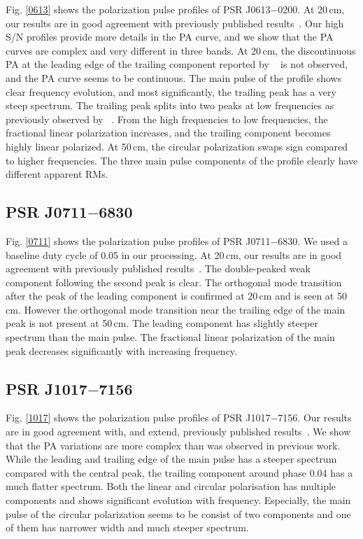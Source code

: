 \documentclass[useAMS,usenatbib]{mn2e}
\begin{document}
\begin{appendix}
Fig. \ref{0613} shows the polarization pulse profiles of 
PSR J0613$-$0200.
%
At 20\,cm, our results are in good agreement with previously published
results~\citep{Ord04,Yan11}. 
%
Our high S/N profiles provide more details in the PA curve, and we show that 
the PA curves are complex and very different in three bands. 
%
At 20\,cm, the discontinuous PA at the leading edge of the trailing 
component reported by ~\citet{Yan11} is not observed, and the PA curve seems 
to be continuous.
%
The main pulse of the profile shows clear frequency evolution, and most 
significantly, the trailing peak has a very steep spectrum. The 
trailing peak splits into two peaks at low frequencies as previously 
observed by ~\citet{Stairs99}.
%
From the high frequencies to low frequencies, the fractional linear 
polarization increases, and the trailing component becomes highly linear 
polarized. 
%
At 50\,cm, the circular polarization swaps sign compared to higher 
frequencies.
%
The three main pulse components of the profile clearly have different 
apparent RMs. 

\subsection{PSR J0711$-$6830}

Fig. \ref{0711} shows the polarization pulse profiles 
of PSR J0711$-$6830.
%
We used a baseline duty cycle of 0.05 in our processing.
%
At 20\,cm, our results are in good agreement with previously published
results~\citep{Ord04,Yan11}. 
%
The double-peaked weak component following the second peak is clear.
%
The orthogonal mode transition after the peak of the leading component 
is confirmed at 20\,cm and is seen at 50\,cm.
However the orthogonal mode transition near the trailing edge 
of the main peak is not present at 50\,cm.
%
The leading component has slightly steeper spectrum than the main pulse. 
The fractional linear polarization of the main peak decreases significantly 
with increasing frequency. 


\subsection{PSR J1017$-$7156}

Fig. \ref{1017} shows the polarization pulse profiles of 
PSR J1017$-$7156.
%
Our results are in good agreement with, and extend, previously published 
results~\citep{Keith12}. 
%
We show that the PA variations are more complex than was observed in 
previous work.
%
While the leading and trailing edge of the main pulse has a steeper spectrum 
compared with the central peak, the trailing component around phase 0.04 has
a much flatter spectrum.
%
Both the linear and circular polarisation has multiple components and shows 
significant evolution with frequency. Especially, the main pulse of the 
circular polarization seems to be consist of two components and one of 
them has narrower width and much steeper spectrum.
%


\end{appendix}
\end{document}

